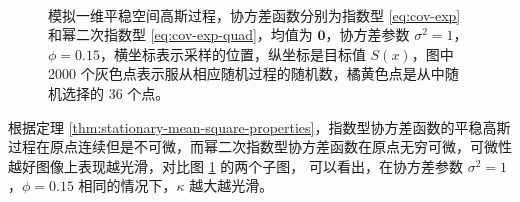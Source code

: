 \documentclass[12pt,a4paper,UTF8,twoside]{book}
\theoremstyle{definition}
\theoremstyle{definition}
\theoremstyle{definition}
\theoremstyle{remark}
\begin{document}
\begin{figure}

{\centering {}\\

}

\caption{模拟一维平稳空间高斯过程，协方差函数分别为指数型
\eqref{eq:cov-exp} 和幂二次指数型 \eqref{eq:cov-exp-quad}，均值为
\(\mathbf{0}\)，协方差参数
\(\sigma^2 = 1\)，\(\phi = 0.15\)，横坐标表示采样的位置，纵坐标是目标值
\(S(x)\)，图中 2000
个灰色点表示服从相应随机过程的随机数，橘黄色点是从中随机选择的 36 个点。}\label{fig:one-dim-gp}
\end{figure}








根据定理
\ref{thm:stationary-mean-square-properties}，指数型协方差函数的平稳高斯过程在原点连续但是不可微，而幂二次指数型协方差函数在原点无穷可微，可微性越好图像上表现越光滑，对比图
\ref{fig:one-dim-gp} 的两个子图， 可以看出，在协方差参数
\(\sigma^2 = 1\)，\(\phi = 0.15\) 相同的情况下，\(\kappa\) 越大越光滑。
\end{document}
